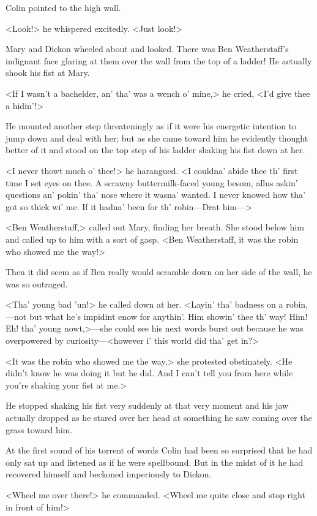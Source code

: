 Colin pointed to the high wall.

<Look!> he whispered excitedly. <Just look!>

Mary and Dickon wheeled about and looked. There was Ben Weatherstaff's indignant face glaring at them over the wall from the top of a ladder! He actually shook his fist at Mary.

<If I wasn't a bachelder, an' tha' was a wench o' mine,> he cried, <I'd give thee a hidin'!>

He mounted another step threateningly as if it were his energetic intention to jump down and deal with her; but as she came toward him he evidently thought better of it and stood on the top step of his ladder shaking his fist down at her.

<I never thowt much o' thee!> he harangued. <I couldna' abide thee th' first time I set eyes on thee. A scrawny buttermilk-faced young besom, allus askin' questions an' pokin' tha' nose where it wasna' wanted. I never knowed how tha' got so thick wi' me. If it hadna' been for th' robin—Drat him—>

<Ben Weatherstaff,> called out Mary, finding her breath. She stood below him and called up to him with a sort of gasp. <Ben Weatherstaff, it was the robin who showed me the way!>

Then it did seem as if Ben really would scramble down on her side of the wall, he was so outraged.

<Tha' young bad 'un!> he called down at her. <Layin' tha' badness on a robin,—not but what he's impidint enow for anythin'. Him showin' thee th' way! Him! Eh! tha' young nowt,>—she could see his next words burst out because he was overpowered by curiosity—<however i' this world did tha' get in?>

<It was the robin who showed me the way,> she protested obstinately. <He didn't know he was doing it but he did. And I can't tell you from here while you're shaking your fist at me.>

He stopped shaking his fist very suddenly at that very moment and his jaw actually dropped as he stared over her head at something he saw coming over the grass toward him.

At the first sound of his torrent of words Colin had been so surprised that he had only sat up and listened as if he were spellbound. But in the midst of it he had recovered himself and beckoned imperiously to Dickon.

<Wheel me over there!> he commanded. <Wheel me quite close and stop right in front of him!>

